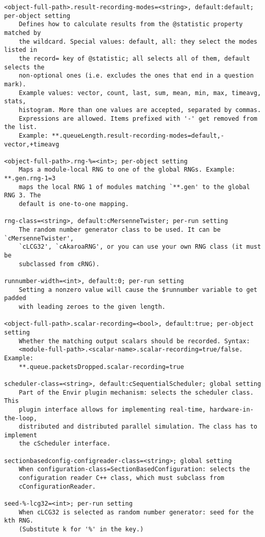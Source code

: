 \begin{verbatim}
<object-full-path>.result-recording-modes=<string>, default:default; per-object setting
    Defines how to calculate results from the @statistic property matched by
    the wildcard. Special values: default, all: they select the modes listed in
    the record= key of @statistic; all selects all of them, default selects the
    non-optional ones (i.e. excludes the ones that end in a question mark).
    Example values: vector, count, last, sum, mean, min, max, timeavg, stats,
    histogram. More than one values are accepted, separated by commas.
    Expressions are allowed. Items prefixed with '-' get removed from the list.
    Example: **.queueLength.result-recording-modes=default,-vector,+timeavg

<object-full-path>.rng-%=<int>; per-object setting
    Maps a module-local RNG to one of the global RNGs. Example: **.gen.rng-1=3
    maps the local RNG 1 of modules matching `**.gen' to the global RNG 3. The
    default is one-to-one mapping.

rng-class=<string>, default:cMersenneTwister; per-run setting
    The random number generator class to be used. It can be `cMersenneTwister',
    `cLCG32', `cAkaroaRNG', or you can use your own RNG class (it must be
    subclassed from cRNG).

runnumber-width=<int>, default:0; per-run setting
    Setting a nonzero value will cause the $runnumber variable to get padded
    with leading zeroes to the given length.

<object-full-path>.scalar-recording=<bool>, default:true; per-object setting
    Whether the matching output scalars should be recorded. Syntax:
    <module-full-path>.<scalar-name>.scalar-recording=true/false. Example:
    **.queue.packetsDropped.scalar-recording=true

scheduler-class=<string>, default:cSequentialScheduler; global setting
    Part of the Envir plugin mechanism: selects the scheduler class. This
    plugin interface allows for implementing real-time, hardware-in-the-loop,
    distributed and distributed parallel simulation. The class has to implement
    the cScheduler interface.

sectionbasedconfig-configreader-class=<string>; global setting
    When configuration-class=SectionBasedConfiguration: selects the
    configuration reader C++ class, which must subclass from
    cConfigurationReader.

seed-%-lcg32=<int>; per-run setting
    When cLCG32 is selected as random number generator: seed for the kth RNG.
    (Substitute k for '%' in the key.)


\end{verbatim}
